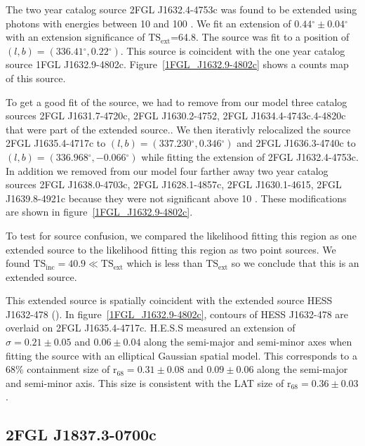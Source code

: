 \documentclass[12pt,preprint]{aastex}
\newcommand{\gev}{\text{GeV}\xspace}
\newcommand{\tev}{\text{TeV}\xspace}
\newcommand{\tsext}{{\ensuremath{\text{TS}_\text{ext}}}\xspace}
\newcommand{\tsinc}{\ensuremath{\text{TS}_\text{inc}}\xspace}
\newcommand{\rsixeight}{{\ensuremath{\text{r}_{68}}}\xspace}
\renewcommand{\deg}{\ensuremath{^\circ}\xspace}
\begin{document}
The two year catalog source 2FGL J1632.4-4753c was found to be
extended using photons with energies between 10 \gev and 100 \gev.
We fit an extension of $0.44\deg\pm0.04\deg$ with an extension
significance of \tsext=64.8.  The source was fit to a position of
$(l,b)=(336.41\deg,0.22\deg)$.  This source is coincident with the one
year catalog source 1FGL J1632.9-4802c.  Figure~\ref{1FGL_J1632.9-4802c}
shows a counts map of this source.

To get a good fit of the source, we had to remove from our model
three catalog sources 2FGL J1631.7-4720c, 2FGL J1630.2-4752, 2FGL
J1634.4-4743c.4-4820c that were part of the extended source..
We then iterativly relocalized the source 2FGL J1635.4-4717c
to $(l,b)=(337.230\deg,0.346\deg)$ and 2FGL J1636.3-4740c to
$(l,b)=(336.968\deg,-0.066\deg)$ while fitting the extension of
2FGL J1632.4-4753c.  In addition we removed from our model four
farther away two year catalog sources 2FGL J1638.0-4703c, 2FGL
J1628.1-4857c, 2FGL  J1630.1-4615, 2FGL J1639.8-4921c because they
were not significant above 10 \gev.  These modifications are shown in
figure~\ref{1FGL_J1632.9-4802c}.

To test for source confusion, we compared the likelihood fitting this
region as one extended source to the likelihood fitting this region as
two point sources. We found $\tsinc=40.9\ll\tsext$ which is less than \tsext
so we conclude that this is an extended source.

This extended source is spatially coincident with the extended \tev source HESS
J1632-478 (\cite{HESS_plane_survey}).  In figure~\ref{1FGL_J1632.9-4802c},
contours of  HESS J1632-478 are overlaid on 2FGL J1635.4-4717c.
H.E.S.S measured an extension of $\sigma=0.21\pm0.05$ and
$0.06\pm0.04$ along the semi-major and semi-minor axes when fitting the source
with an elliptical Gaussian spatial model.  This corresponds to a 68\%
containment size of $\rsixeight=0.31\pm0.08$ and $0.09\pm0.06$ along the
semi-major and semi-minor axis. This size is consistent with the LAT size of
$\rsixeight=0.36\pm0.03$.


\subsection{2FGL J1837.3-0700c}
\label{section_2FGL_J1837.3-0700c}

\end{document}
